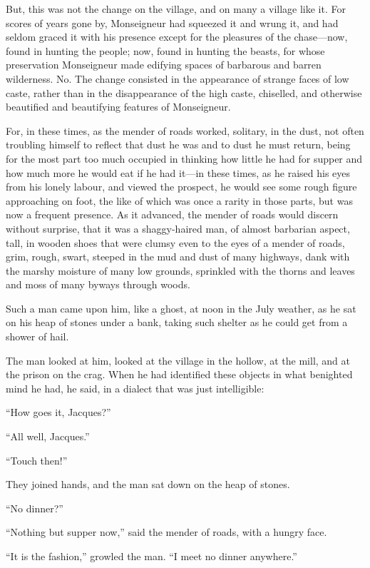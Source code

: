 But, this was not the change on the village, and on many a village
like it.  For scores of years gone by, Monseigneur had squeezed it
and wrung it, and had seldom graced it with his presence except for
the pleasures of the chase---now, found in hunting the people; now,
found in hunting the beasts, for whose preservation Monseigneur made
edifying spaces of barbarous and barren wilderness.  No.  The change
consisted in the appearance of strange faces of low caste, rather than
in the disappearance of the high caste, chiselled, and otherwise
beautified and beautifying features of Monseigneur.

For, in these times, as the mender of roads worked, solitary, in the
dust, not often troubling himself to reflect that dust he was and to
dust he must return, being for the most part too much occupied in
thinking how little he had for supper and how much more he would eat
if he had it---in these times, as he raised his eyes from his lonely
labour, and viewed the prospect, he would see some rough figure
approaching on foot, the like of which was once a rarity in those
parts, but was now a frequent presence.  As it advanced, the mender
of roads would discern without surprise, that it was a shaggy-haired
man, of almost barbarian aspect, tall, in wooden shoes that were
clumsy even to the eyes of a mender of roads, grim, rough, swart,
steeped in the mud and dust of many highways, dank with the marshy
moisture of many low grounds, sprinkled with the thorns and leaves
and moss of many byways through woods.

Such a man came upon him, like a ghost, at noon in the July weather,
as he sat on his heap of stones under a bank, taking such shelter as
he could get from a shower of hail.

The man looked at him, looked at the village in the hollow, at the
mill, and at the prison on the crag.  When he had identified these
objects in what benighted mind he had, he said, in a dialect that
was just intelligible:

``How goes it, Jacques?''

``All well, Jacques.''

``Touch then!''

They joined hands, and the man sat down on the heap of stones.

``No dinner?''

``Nothing but supper now,'' said the mender of roads, with a hungry face.

``It is the fashion,'' growled the man.  ``I meet no dinner anywhere.''

